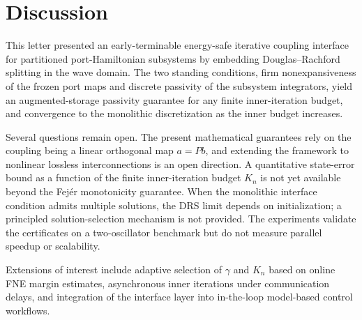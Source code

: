 \section{Discussion}
\label{sec:discussion}

This letter presented an early-terminable energy-safe iterative coupling interface for partitioned port-Hamiltonian subsystems by embedding Douglas--Rachford splitting in the wave domain. The two standing conditions, firm nonexpansiveness of the frozen port maps and discrete passivity of the subsystem integrators, yield an augmented-storage passivity guarantee for any finite inner-iteration budget, and convergence to the monolithic discretization as the inner budget increases.

Several questions remain open. The present mathematical guarantees rely on the coupling being a linear orthogonal map $a=Pb$, and extending the framework to nonlinear lossless interconnections is an open direction. A quantitative state-error bound as a function of the finite inner-iteration budget $K_n$ is not yet available beyond the Fejér monotonicity guarantee. When the monolithic interface condition admits multiple solutions, the DRS limit depends on initialization; a principled solution-selection mechanism is not provided. The experiments validate the certificates on a two-oscillator benchmark but do not measure parallel speedup or scalability.

Extensions of interest include adaptive selection of $\gamma$ and $K_n$ based on online FNE margin estimates, asynchronous inner iterations under communication delays, and integration of the interface layer into in-the-loop model-based control workflows.
